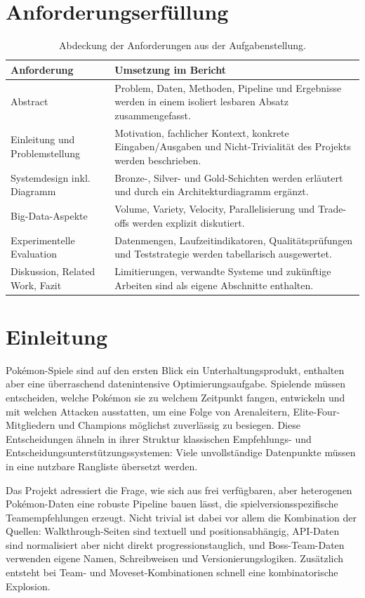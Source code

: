 \documentclass[sigconf,nonacm]{acmart}
\begin{document}
\section*{Anforderungserfüllung}
\begin{table}[t]
  \caption{Abdeckung der Anforderungen aus der Aufgabenstellung.}
  \label{tab:anforderungen}
  \begin{tabularx}{\textwidth}{@{}lX@{}}
    \toprule
    Anforderung & Umsetzung im Bericht \\
    \midrule
    Abstract & Problem, Daten, Methoden, Pipeline und Ergebnisse werden in einem isoliert lesbaren Absatz zusammengefasst. \\
    Einleitung und Problemstellung & Motivation, fachlicher Kontext, konkrete Eingaben/Ausgaben und Nicht-Trivialität des Projekts werden beschrieben. \\
    Systemdesign inkl. Diagramm & Bronze-, Silver- und Gold-Schichten werden erläutert und durch ein Architekturdiagramm ergänzt. \\
    Big-Data-Aspekte & Volume, Variety, Velocity, Parallelisierung und Trade-offs werden explizit diskutiert. \\
    Experimentelle Evaluation & Datenmengen, Laufzeitindikatoren, Qualitätsprüfungen und Teststrategie werden tabellarisch ausgewertet. \\
    Diskussion, Related Work, Fazit & Limitierungen, verwandte Systeme und zukünftige Arbeiten sind als eigene Abschnitte enthalten. \\
    \bottomrule
  \end{tabularx}
\end{table}

\section{Einleitung}
Pokémon-Spiele sind auf den ersten Blick ein Unterhaltungsprodukt, enthalten aber eine überraschend datenintensive Optimierungsaufgabe. Spielende müssen entscheiden, welche Pokémon sie zu welchem Zeitpunkt fangen, entwickeln und mit welchen Attacken ausstatten, um eine Folge von Arenaleitern, Elite-Four-Mitgliedern und Champions möglichst zuverlässig zu besiegen. Diese Entscheidungen ähneln in ihrer Struktur klassischen Empfehlungs- und Entscheidungsunterstützungssystemen: Viele unvollständige Datenpunkte müssen in eine nutzbare Rangliste übersetzt werden.

Das Projekt adressiert die Frage, wie sich aus frei verfügbaren, aber heterogenen Pokémon-Daten eine robuste Pipeline bauen lässt, die spielversionsspezifische Teamempfehlungen erzeugt. Nicht trivial ist dabei vor allem die Kombination der Quellen: Walkthrough-Seiten sind textuell und positionsabhängig, API-Daten sind normalisiert aber nicht direkt progressionstauglich, und Boss-Team-Daten verwenden eigene Namen, Schreibweisen und Versionierungslogiken. Zusätzlich entsteht bei Team- und Moveset-Kombinationen schnell eine kombinatorische Explosion.
\end{document}
